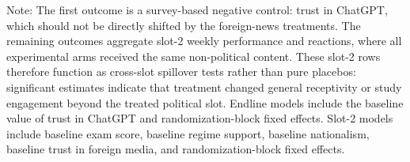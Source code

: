 \begin{table}[H]
\begin{threeparttable}
\begin{tablenotes}[flushleft]
\item Note: The first outcome is a survey-based negative control: trust in ChatGPT, which should not be directly shifted by the foreign-news treatments. The remaining outcomes aggregate slot-2 weekly performance and reactions, where all experimental arms received the same non-political content. These slot-2 rows therefore function as cross-slot spillover tests rather than pure placebos: significant estimates indicate that treatment changed general receptivity or study engagement beyond the treated political slot. Endline models include the baseline value of trust in ChatGPT and randomization-block fixed effects. Slot-2 models include baseline exam score, baseline regime support, baseline nationalism, baseline trust in foreign media, and randomization-block fixed effects.
\end{tablenotes}
\end{threeparttable}
\end{table}
